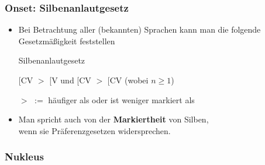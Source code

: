 \begin{frame}
\frametitle{Onset: Silbenanlautgesetz}

\begin{itemize}
	\item Bei Betrachtung aller (bekannten) Sprachen kann man die folgende Gesetzmäßigkeit feststellen \citep[cf.][212f.]{Hall00a}
	
	\begin{block}{Silbenanlautgesetz}
	
	\sub{$\sigma$}[CV $>$ \sub{$\sigma$}[V 
	und
	\sub{$\sigma$}[CV $>$ \sub{$\sigma$}[CV (wobei $n \geq 1$)
	
	$>$ $:=$ häufiger als oder ist weniger markiert als 

	
	\end{block}
	 
	 \item Man spricht auch von der \textbf{Markiertheit} von Silben,\\
	 wenn sie Präferenzgesetzen widersprechen.

\end{itemize}

\end{frame}


\subsubsection{Nukleus}

